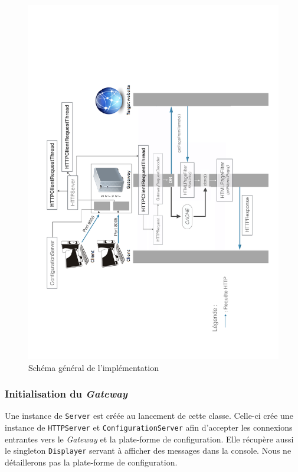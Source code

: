 \documentclass[a4paper,11pt]{article}
\begin{document}
\begin{figure}
	\center
	\includegraphics[scale=0.85]{schema-general}
	\caption{Schéma général de l'implémentation}
	\label{fig:schema_general}
\end{figure}

	\subsubsection{Initialisation du \textit{Gateway}}
Une instance de \texttt{Server} est créée au lancement de cette classe. Celle-ci crée une instance de \texttt{HTTPServer} et \texttt{ConfigurationServer} afin d'accepter les connexions entrantes vers le \textit{Gateway} et la plate-forme de configuration. Elle récupère aussi le singleton \texttt{Displayer} servant à afficher des messages dans la console. Nous ne détaillerons pas la plate-forme de configuration.
\end{document}
